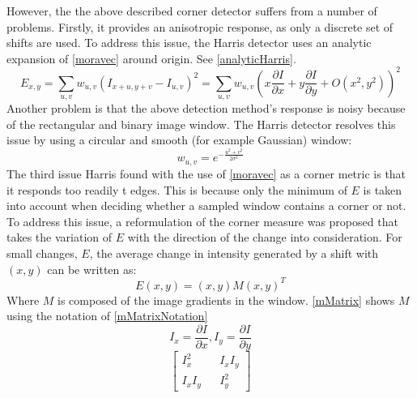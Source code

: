 However, the the above described corner detector suffers from a number of problems\cite{Harris88alvey}.
Firstly, it provides an anisotropic response, as only a discrete set of shifts are used.
To address this issue, the Harris detector uses an analytic expansion of \eqref{moravec} around origin.
See \eqref{analyticHarris}.
\begin{equation}
	E_{x,y} = \sum_{u,v} w_{u,v} ( I_{x+u,y+v}-I_{u,v} )^2 = \sum_{u,v} w_{u,v} ( x \frac{\partial I}{\partial x} + y \frac{\partial I}{\partial y} + O(x^2,y^2))^2
	\label{eq:analyticHarris}
\end{equation}
Another problem is that the above detection method's response is noisy\cite{Harris88alvey} because of the rectangular and binary image window.
The Harris detector resolves this issue by using a circular and smooth (for example Gaussian) window:
\begin{equation}
	w_{u,v} = e^{- \frac{u^2 + v^2}{2\sigma^2}}
\end{equation}
The third issue Harris found with the use of \eqref{moravec} as a corner metric is that it responds too readily t edges\cite{Harris88alvey}.
This is because only the minimum of $E$ is taken into account when deciding whether a sampled window contains a corner or not.
To address this issue, a reformulation of the corner measure was proposed that takes the variation of $E$ with the direction of the change into consideration.
For small changes, $E$, the average change in intensity generated by a shift with $(x,y)$ can be written as:
\begin{equation}
	E(x,y) = (x,y) M (x,y)^T
\end{equation}
Where $M$ is composed of the image gradients in the window. \eqref{mMatrix} shows $M$ using the notation of \eqref{mMatrixNotation}
\begin{equation}
	I_x = \frac{\partial I}{\partial x}, I_y = \frac{\partial I}{\partial y}
	\label{eq:mMatrixNotation}
\end{equation}
\begin{equation}
\begin{bmatrix}
	I_x^2 && I_x I_y \\
	I_x I_y && I_y^2
\end{bmatrix}
	\label{eq:mMatrix}
\end{equation}

